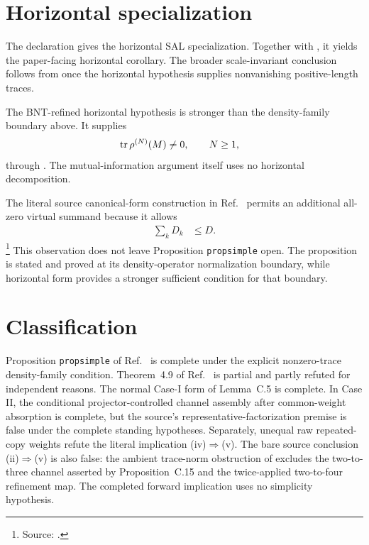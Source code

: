 \documentclass{article}
\begin{document}
\section{Horizontal specialization}

The declaration  gives the horizontal
SAL specialization. Together with
, it yields the
paper-facing horizontal corollary. The broader scale-invariant conclusion
follows from 
once the horizontal hypothesis supplies nonvanishing positive-length traces.

The BNT-refined horizontal hypothesis is stronger than the
density-family boundary above. It supplies
\begin{align}
    \operatorname{tr}\rho^{(N)}(M)
        &\ne
        0,
        \qquad N\geq 1,
    \label{eq:cpsv16_rfp_sal_data_processing_horizontal_nonzero_trace}
\end{align}
through
.
The mutual-information argument itself uses no horizontal decomposition.

The literal source canonical-form construction in
Ref.~\cite{Cirac2016MPDO_arXiv} permits an additional all-zero virtual summand
because it allows
\begin{align}
    \sum_k D_k
        &\leq
        D.
    \label{eq:cpsv16_rfp_sal_data_processing_source_virtual_dimension_bound}
\end{align}
\footnote{Source:
.}
This observation does not leave Proposition \texttt{propsimple} open. The
proposition is stated and proved at its density-operator normalization
boundary, while horizontal form provides a stronger sufficient condition for
that boundary.

\section{Classification}

Proposition \texttt{propsimple} of Ref.~\cite{Cirac2016MPDO_arXiv} is complete
under the explicit nonzero-trace density-family condition. Theorem~4.9 of
Ref.~\cite{Cirac2017MPDO_AnnPhys} is partial and partly refuted for independent
reasons. The normal Case-I form of Lemma~C.5 is complete. In Case II, the
conditional projector-controlled channel assembly after common-weight
absorption is complete, but the source's representative-factorization premise
is false under the complete standing hypotheses. Separately, unequal raw
repeated-copy weights refute the literal implication (iv)$\Rightarrow$(v).
The bare source conclusion (ii)$\Rightarrow$(v) is also false: the ambient
trace-norm obstruction of
 excludes the
two-to-three channel asserted by Proposition~C.15 and the twice-applied
two-to-four refinement map. The completed forward implication uses no
simplicity hypothesis.
\end{document}
